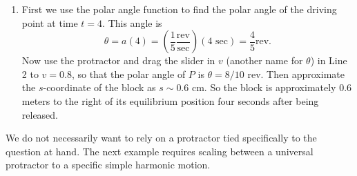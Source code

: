 \documentclass{ximera}
\begin{document}
\begin{example}
\begin{explanation}
\begin{enumerate}
\item First we use the polar angle function to find the polar angle of the driving point at time $t=4$. This angle is
\[
 \theta = a(4) = \left( \frac{1}{5}  \frac{\text{rev}}{\text{sec}}  \right) (4 \text{ sec}) = \frac{4}{5} \text{rev}.
\]
Now use the protractor and drag the slider in $v$ (another name for $\theta$) in Line 2 to $v=0.8$, so that the polar angle of $P$ is $\theta = 8/10$ rev. Then approximate the $s$-coordinate of the block as $s\sim 0.6$ cm. So the block is approximately $0.6$ meters to the right of its equilibrium position four seconds after being released.
\end{enumerate} 
\end{explanation}

\end{example}



We do not necessarily want to rely on a protractor tied specifically to the question at hand. The next example requires scaling between a universal protractor to a specific simple harmonic motion. 
\end{document}
